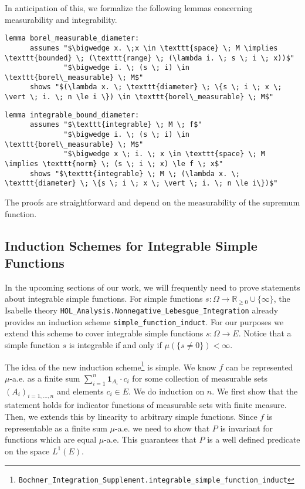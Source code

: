 In anticipation of this, we formalize the following lemmas concerning measurability and integrability.

\begin{isalemma}
{\small
	\begin{lstlisting}[style=isabelle]
	lemma borel_measurable_diameter: 
	  assumes "$\bigwedge x. \;x \in \texttt{space} \; M \implies \texttt{bounded} \; (\texttt{range} \; (\lambda i. \; s \; i \; x))$"
			  "$\bigwedge i. \; (s \; i) \in \texttt{borel\_measurable} \; M$"
	  shows "$(\lambda x. \; \texttt{diameter} \; \{s \; i \; x \; \vert \; i. \; n \le i \}) \in \texttt{borel\_measurable} \; M$"
  	\end{lstlisting}
}
\end{isalemma}

\begin{isalemma}
{\small
	\begin{lstlisting}[style=isabelle]
	lemma integrable_bound_diameter: 
	  assumes "$\texttt{integrable} \; M \; f$" 
			  "$\bigwedge i. \; (s \; i) \in \texttt{borel\_measurable} \; M$"
			  "$\bigwedge x \; i. \; x \in \texttt{space} \; M \implies \texttt{norm} \; (s \; i \; x) \le f \; x$"
	  shows "$\texttt{integrable} \; M \; (\lambda x. \; \texttt{diameter} \; \{s \; i \; x \; \vert \; i. \; n \le i\})$"
  	\end{lstlisting}
}
\end{isalemma}

The proofs are straightforward and depend on the measurability of the supremum function.

\subsection{Induction Schemes for Integrable Simple Functions}

In the upcoming sections of our work, we will frequently need to prove statements about integrable simple functions. For simple functions $s : \Omega \rightarrow \mathbb{R}_{\ge 0} \cup \{\infty\}$, the Isabelle theory \texttt{HOL\_Analysis.Nonnegative\_Lebesgue\_Integration} already provides an induction scheme \texttt{simple\_function\_induct}. For our purposes we extend this scheme to cover integrable simple functions $s : \Omega \rightarrow E$. Notice that a simple function $s$ is integrable if and only if $\mu(\{s \neq 0\}) < \infty$.

The idea of the new induction scheme\footnote{\texttt{Bochner\_Integration\_Supplement.integrable\_simple\_function\_induct}} is simple. We know $f$ can be represented $\mu$-a.e. as a finite sum $\sum_{i=1}^n \mathbf{1}_{A_i} \cdot c_i$  for some collection of measurable sets $(A_i)_{i=1,\dots,n}$ and elements $c_i \in E$. We do induction on $n$. We first show that the statement holds for indicator functions of measurable sets with finite measure. Then, we extends this by linearity to arbitrary simple functions. Since $f$ is representable as a finite sum $\mu$-a.e. we need to show that $P$ is invariant for functions which are equal $\mu$-a.e. This guarantees that $P$ is a well defined predicate on the space $L^1(E)$.

